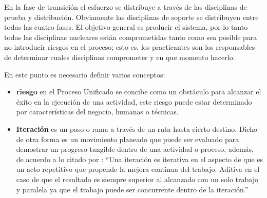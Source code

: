 En la fase de transición el esfuerzo se distribuye a través de las disciplinas de prueba y distribución. Obviamente las disciplinas de soporte se distribuyen entre todas las cuatro fases. El objetivo general es producir el sistema, por lo tanto todas las disciplinas nucleares están comprometidas tanto como sea posible para no introducir riesgos en el proceso; esto es, los practicantes son los responsables de determinar cuales disciplinas comprometer y en que momento hacerlo.

En este punto es necesario definir varios conceptos: 
\begin{itemize}
\item \textbf{riesgo} en el Proceso Unificado se concibe como un obstáculo para alcanzar el éxito en la ejecución de una actividad, este riesgo puede estar determinado por características del negocio, humanas o técnicas.

\item \textbf{Iteración} es un paso o rama a través de un ruta hasta cierto destino. Dicho de otra forma es un movimiento planeado que puede ser evaluado para demostrar un progreso tangible dentro de una actividad o proceso, además, de acuerdo a lo citado por \cite{Zavala2000}: “Una iteración es iterativa en el aspecto de que es un acto repetitivo que propende la mejora continua del trabajo. Aditiva en el caso de que el resultado es siempre superior al alcanzado con un solo trabajo y paralela ya que el trabajo puede ser concurrente dentro de la iteración.”

\end{itemize}


